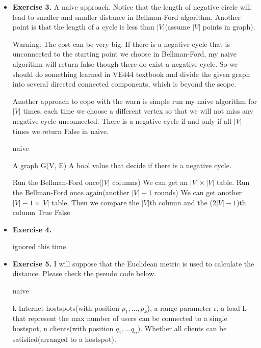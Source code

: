 \documentclass{article}
\begin{document}
\begin{itemize}
\item \textbf{Exercise 3.}
A naive approach. Notice that the length of negative circle will lead to smaller and smaller distance in Bellman-Ford algorithm. Another point is that the length of a cycle is less than $|V|$(assume $|V|$ points in graph).

Warning: The cost can be very big. If there is a negative cycle that is unconnected to the starting point we choose in Bellman-Ford, my naive algorithm will return false though there do exist a negative cycle. So we should do something learned in VE444 textbook and divide the given graph into several directed connected components, which is beyond the scope. 

Another approach to cope with the warn is simple run my naive algorithm for $|V|$ times, each time we choose a different vertex so that we will not miss any negative cycle unconnected. There is a negative cycle if and only if all $|V|$ times we return False in naive.

\begin{algorithm}[H]  
    \caption{naive}  
    \begin{algorithmic}[1]  
        \Require A graph G(V, E)
        \Ensure A bool value that decide if there is a negative cycle.

        \State Run the Bellman-Ford once($|V|$ columns)
        \State We can get an $|V|\times |V|$ table.
        \State Run the Bellman-Ford once again(another $|V|-1$ rounds)
        \State We can get another $|V|-1\times |V|$ table.
        \State Then we compare the $|V|$th column and the ($2|V| - 1$)th column  
            \State \Return True
        \EndIf
        \State \Return False

    \end{algorithmic}  
\end{algorithm}

\item \textbf{Exercise 4.}

ignored this time

\item \textbf{Exercise 5.}
I will suppose that the Euclidean metric is used to calculate the distance. Please check the pseudo code below.

\begin{algorithm}[H]  
    \caption{naive}  
    \begin{algorithmic}[1]  
        \Require k Internet hostspots(with position $p_1, ..., p_k$), a range parameter r, a load L that represent the max number of users can be connected to a single hostspot, n clients(with position $q_1, ... q_n$). 
        \Ensure Whether all clients can be satisfied(arranged to a hostspot).


\end{algorithmic}
\end{algorithm}
\end{itemize}
\end{document}
